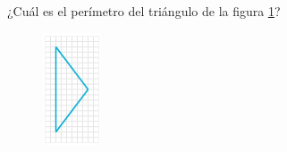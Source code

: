 
¿Cuál es el perímetro del triángulo de la figura \ref{fig:peri_isos_03}?

\begin{figure}[H]
    \centering
    \includegraphics[width=0.15\textwidth]{../images/peri_isos_03.png}
    \caption{}
    \label{fig:peri_isos_03}
\end{figure}
